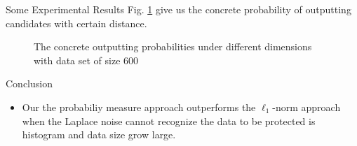 \documentclass[final,hyperref={pdfpagelabels=false}]{beamer}
\begin{document}
\begin{frame}[t]
\begin{columns}[t]
\begin{column}{.485\textwidth}
\begin{block}{Some Experimental Results}
Fig. \ref{fig_concrete_prob} give us the concrete probability of outputting candidates with certain distance.
\begin{figure}[H]
\begin{center}
\centering
\caption{The concrete outputting probabilities under different dimensions with data set of size $600$}
\label{fig_concrete_prob}
\end{center}
\end{figure}

\end{block}




\begin{block}{Conclusion}

\begin{itemize}
  \item Our the probabiliy measure approach outperforms the $\ell_1$-norm approach when the Laplace noise cannot recognize the data to be protected is histogram and data size grow large.


\end{itemize}
\end{block}
\end{column}
\end{columns}
\end{frame}
\end{document}
